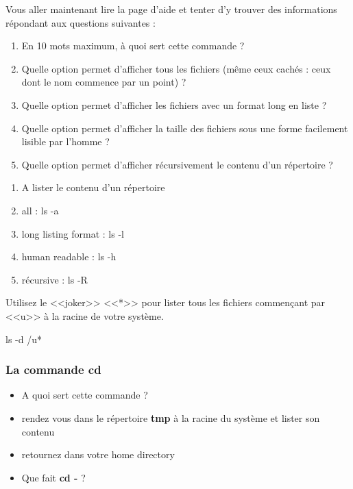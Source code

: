 \documentclass[11pt]{article}
\begin{document}
Vous aller maintenant lire la page d’aide et tenter d'y trouver des informations répondant aux questions suivantes :

\begin{enumerate}
 \item En 10 mots maximum, à quoi sert cette commande ?
 \item Quelle option permet d’afficher tous les fichiers (même ceux cachés : ceux dont le nom commence par un point) ?
 \item Quelle option permet d’afficher les fichiers avec un format long en liste ?
 \item Quelle option permet d’afficher la taille des fichiers sous une forme facilement lisible par l’homme ?
 \item Quelle option permet d’afficher récursivement le contenu d'un répertoire ?
\end{enumerate}

\begin{solution}
 \begin{enumerate}
  \item A lister le contenu d'un répertoire
  \item all : ls -a
  \item long listing format : ls -l
  \item human readable : ls -h
  \item récursive : ls -R
 \end{enumerate}
\end{solution}

Utilisez le <<joker>> <<*>> pour lister tous les fichiers commençant par <<u>> à la racine de votre système.

\begin{solution}
ls -d /u*
\end{solution}

\subsubsection{La commande \textbf{cd}}

\begin{itemize}
 \item A quoi sert cette commande ? 
 \item rendez vous dans le répertoire \textbf{tmp} à la racine du système et lister son contenu
 \item retournez dans votre home directory
 \item Que fait \textbf{cd -} ?
\end{itemize}
\end{document}
